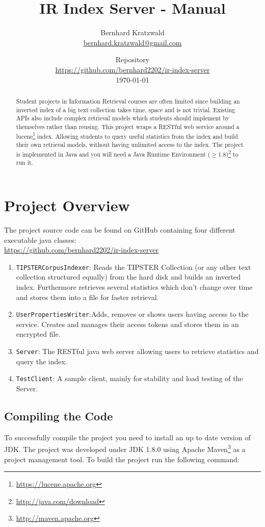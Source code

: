 \documentclass[a4paper,11pt]{article}
\title{IR Index Server - Manual}
\author{Bernhard Kratzwald \\\url{bernhard.kratzwald@gmail.com}}
\date{Repository\\\url{https://github.com/bernhard2202/ir-index-server}\\\today}
\begin{document}
\maketitle

\begin{abstract}
Student projects in Information Retrieval courses are often limited since building an inverted index of a big text collection takes time, space and is not trivial. Existing APIs also include complex retrieval models which students should implement by themselves rather than reusing. This project wraps a RESTful web service around a lucene\footnote{\url{https://lucene.apache.org}} index. Allowing students to query useful statistics from the index and build their own retrieval models, without having unlimited access to the index. The project is implemented in Java and you will need a Java Runtime Environment ($\geq 1.8$)\footnote{\url{http://java.com/download}} to run it.
\end{abstract}

\tableofcontents
\clearpage

\section{Project Overview}
The project source code can be found on GitHub containing four different executable java classes:\\ \url{https://github.com/bernhard2202/ir-index-server}

\begin{enumerate}
\item \texttt{TIPSTERCorpusIndexer}: Reads the TIPSTER Collection (or any other text collection structured equally) from the hard disk and builds an inverted index. Furthermore retrieves several statistics which don't change over time and stores them into a file for faster retrieval.
\item \texttt{UserPropertiesWriter}:Adds, removes or shows users having access to the service. Creates and manages their access tokens and stores them in an encrypted file.
\item \texttt{Server}: The RESTful java web server allowing users to retrieve statistics and query the index. 
\item \texttt{TestClient}: A sample client, mainly for stability and load testing of the Server.
\end{enumerate}

\subsection{Compiling the Code}
\label{sec:comp}
To successfully compile the project you need to install an up to date version of JDK. The project was developed under JDK 1.8.0 using Apache Maven\footnote{\url{http://maven.apache.org}} as a project management tool. To build the project run the following command:\\
\end{document}
